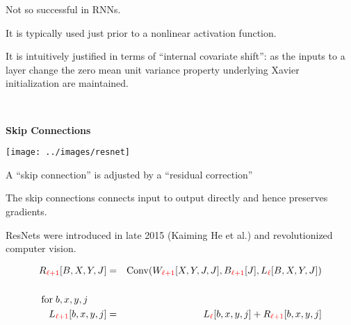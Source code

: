 {\vfill
Not so successful in RNNs.

\vfill
It is typically used just prior to a nonlinear activation function.

\vfill
It is intuitively justified in terms of ``internal covariate shift'':
as the inputs to a layer change the zero mean unit variance property underlying Xavier initialization are maintained.


\vfill
\eject
~ \vfill
\centerline{\bf Skip Connections}
\vfill
\vfill


\vfill
\texttt{[image: ../images/resnet]}
\hfill \begin{minipage}[b]{4in}
  A ``skip connection'' is adjusted by a ``residual correction''

  \bigskip
  The skip connections connects input to output directly and hence preserves gradients.

  \bigskip
  ResNets were introduced in late 2015 (Kaiming He et al.) and revolutionized computer vision.
\end{minipage}


\medskip
\begin{eqnarray*}
R_{\color{red} \ell+1}[B,X,Y,J] & = & \mathrm{Conv}(W_{\color{red} \ell+1}[X,Y,J,J],B_{\color{red} \ell+1}[J],L_{\color{red} \ell}[B,X,Y,J]) \\
\\
\mathrm{for}\;b,x,y,j\;\;\;\;\;\;\;\\
L_{\color{red} \ell+1}[b,x,y,j] & = & L_{\color{red}\ell}[b,x,y,j] + R_{\color{red} \ell+1}[b,x,y,j]
\end{eqnarray*}

}
